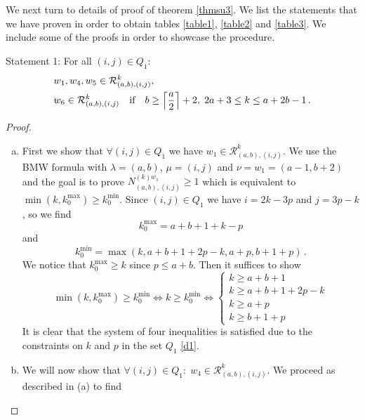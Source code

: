 \documentclass[a4paper,11pt]{article}
\DeclarePairedDelimiter\ceil{\lceil}{\rceil}
\theoremstyle{plain}
\theoremstyle{definition}
\newcommand{\kmin}{k_0^{\text{min}}}
\newcommand{\kmax}{k_0^{\text{max}}}
\begin{document}
We next turn to details of proof of theorem \ref{thmsu3}. We list the statements that we have proven in order to obtain tables \ref{table1}, \ref{table2} and \ref{table3}. We include some of the proofs in order to showcase the procedure.
\begin{description}[wide, labelwidth=!, labelindent=0pt]
\item{Statement 1:}  For all $(i,j)\in Q_1$:
\begin{align}
     &w_1,w_4,w_5\in \mathcal{R}^k_{(a,b),(i,j)},\\
     &w_6\in\mathcal{R}^k_{(a,b),(i,j)} \quad\text{if}\quad b\geq \ceil*{\frac{a}{2}}+2,\; 2a+3\leq k\leq a+2b-1\,. \label{claim1b}
\end{align}
\begin{proof}
    \begin{enumerate}[(a)]
         \item \label{proof1a} First we show that $\forall (i,j)\in Q_1$ we have $w_1\in \mathcal{R}^k_{(a,b),(i,j)}$. We use the BMW formula with $\lambda=(a,b)$, $\mu=(i,j)$ and $\nu=w_1=(a-1,b+2)$ and the goal is to prove $N^{(k)w_1}_{(a,b),(i,j)}\geq 1$ which is equivalent to $\operatorname{min}(k,\kmax)\geq \kmin$. Since $(i,j)\in Q_1$ we have $i=2k-3p$ and $j=3p-k$, so we find
        \begin{equation}
            k_0^{\text{max}}=a+b+1+k-p
        \end{equation}
        and
        \begin{equation}
            k_0^{\text{min}}=\operatorname{max}(k,a+b+1+2p-k,a+p,b+1+p)\,.
        \end{equation}
        We notice that $\kmax \geq k$ since $p\leq a+b$. Then it suffices to show 
        \begin{equation}
            \operatorname{min}(k,k_0^{\text{max}})\geq k_0^{\text{min}}\Longleftrightarrow k\geq \kmin \Longleftrightarrow \left\{\begin{array}{lr}
        k \geq a+b+1 \\
        k\geq a+b+1+2p-k \\
        k\geq a+p \\
        k\geq b+1 +p
        \end{array}\right. 
        \end{equation}
    It is clear that the system of four inequalities is satisfied due to the constraints on $k$ and $p$ in the set $Q_1$ \eqref{d1}.
    \item  We will now show that $\forall(i,j)\in Q_1:\; w_4\in  \mathcal{R}^k_{(a,b),(i,j)}$. We proceed as described in (a) to find

\end{enumerate}
\end{proof}
\end{description}
\end{document}
